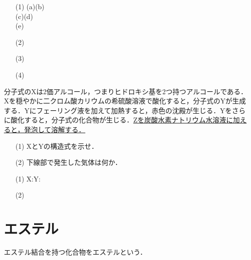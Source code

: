 \documentclass[a4paper,12pt]{ltjsreport}
\begin{document}
\ans 
\begin{itemize}
    \item[(1)](a)\hspace{180pt}(b)\\[70pt]
         (c)\hspace{180pt}(d)\\[70pt]
            (e)\\
    \item[(2)]　\\[20pt]
    \item[(3)]　\\[20pt]
    \item[(4)]　\\[20pt]
\end{itemize}
\begin{que}
分子式のXは2価アルコール，つまりヒドロキシ基を2つ持つアルコールである．Xを穏やかに二クロム酸カリウムの希硫酸溶液で酸化すると，分子式のYが生成する．Yにフェーリング液を加えて加熱すると，赤色の沈殿が生じる．Yをさらに酸化すると，分子式の化合物が生じる．\underline{Zを炭酸水素ナトリウム水溶液に加えると，発泡して溶解する．}
\begin{itemize}
    \item [(1)]XとYの構造式を示せ．
    \item [(2)]下線部で発生した気体は何か．
\end{itemize}
\end{que}
\ans 
\begin{itemize}
    \item [(1)]X:\hspace{200pt}Y:\\[100pt]
    \item [(2)]
\end{itemize}
\newpage
\section{エステル}
エステル結合を持つ化合物をエステルという．
\end{document}
